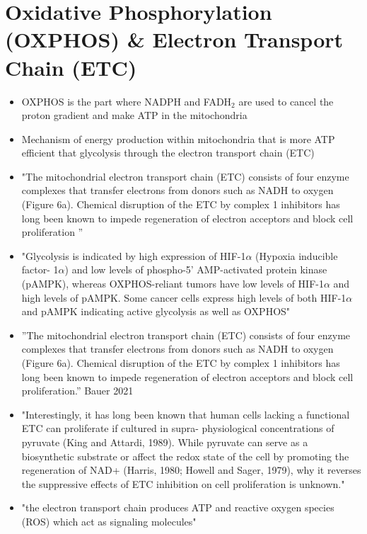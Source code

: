 \documentclass[11pt,a4paper]{article}
\begin{document}
\section{Oxidative Phosphorylation (OXPHOS) \& Electron Transport Chain (ETC)}
\begin{itemize}
\item OXPHOS is the part where NADPH and FADH$_2$ are used to cancel the proton gradient and make ATP in the mitochondria \cite{Berg2006}

\item Mechanism of energy production within mitochondria that is more ATP efficient that glycolysis through the electron transport chain (ETC) \cite{Berg2006}

\item "The mitochondrial electron transport chain (ETC) consists of four enzyme complexes that transfer electrons from donors such as NADH to oxygen (Figure 6a). Chemical disruption of the ETC by complex 1 inhibitors has long been known to impede regeneration of electron acceptors and block cell proliferation ”

\item "Glycolysis is indicated by high expression of HIF-1$\alpha$ (Hypoxia inducible factor- 1$\alpha$) and low levels of phospho-5’ AMP-activated protein kinase (pAMPK), whereas
OXPHOS-reliant tumors have low levels of HIF-1$\alpha$ and high levels of pAMPK. Some cancer cells express high levels of both HIF-1$\alpha$ and pAMPK indicating active glycolysis
as well as OXPHOS" \cite{Nayak2018}

\item ”The mitochondrial electron transport chain (ETC) consists of four enzyme complexes that transfer electrons from donors such as NADH to oxygen (Figure 6a). Chemical disruption of the ETC by complex 1 inhibitors has long been known to impede regeneration of electron acceptors and block cell proliferation.” Bauer 2021

\item "Interestingly, it has long been known that human cells lacking a functional ETC can proliferate if cultured in supra-
physiological concentrations of pyruvate (King and Attardi, 1989). While pyruvate can serve as a biosynthetic substrate or affect the redox state of the cell by promoting the regeneration of NAD+ (Harris, 1980; Howell and Sager, 1979), why it reverses the suppressive effects of ETC inhibition on cell proliferation is unknown."\cite{Birsoy2015}

\item "the electron transport chain produces ATP and reactive oxygen species (ROS) which act as signaling molecules"\cite{Strickland2017}


\end{itemize}
\end{document}
